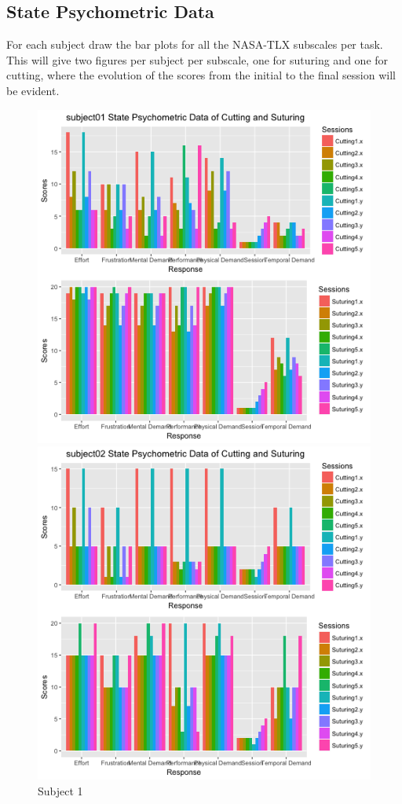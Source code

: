\documentclass[12pt,epsf]{report}
\begin{document}
\subsection*{State Psychometric Data}
For each subject draw the bar plots for all the NASA-TLX subscales per task. This will give two figures per subject per subscale, one for suturing and one for cutting, where the evolution of the scores from the initial to the final session will be evident. \\
\begin{figure}[!ht]
	\begin{minipage}[c]{0.5\linewidth}
	\includegraphics[width=\linewidth]{s1}
	\caption{Subject 1 }
	\end{minipage}
	\hfill
	\begin{minipage}[c]{0.5\linewidth}
	\includegraphics[width=\linewidth]{s2}

\end{minipage}
\end{figure}
\end{document}
